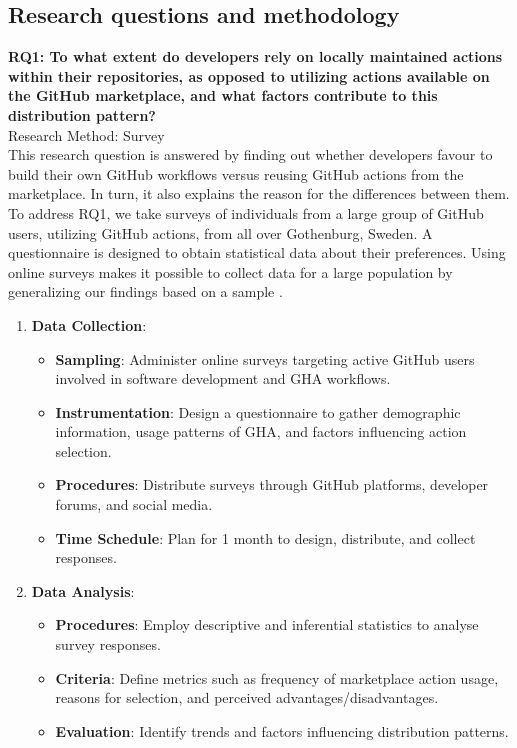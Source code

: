 \documentclass[conference]{IEEEtran}
\begin{document}
\subsection{Research questions and methodology}

\textbf{RQ1: To what extent do developers rely on locally maintained actions within their repositories, as opposed to utilizing actions available on the GitHub marketplace, and what factors contribute to this distribution pattern?}\\

Research Method: Survey\\
	
This research question is answered by finding out whether developers favour to build their own GitHub workflows versus reusing GitHub actions from the marketplace. In turn, it also explains the reason for the differences between them.\\

To address RQ1, we take surveys of individuals from a large group of GitHub users, utilizing GitHub actions, from all over Gothenburg, Sweden. A questionnaire is designed to obtain statistical data about their preferences. Using online surveys makes it possible to collect data for a large population by generalizing our findings based on a sample \cite{linaker2013guidelines}.\\

\begin{enumerate}
    \item \textbf{Data Collection}:\\
    \begin{itemize}
        \item \textbf{Sampling}: Administer online surveys targeting active GitHub users involved in software development and GHA workflows.
        \item \textbf{Instrumentation}: Design a questionnaire to gather demographic information, usage patterns of GHA, and factors influencing action selection.
        \item \textbf{Procedures}: Distribute surveys through GitHub platforms, developer forums, and social media.
        \item \textbf{Time Schedule}: Plan for 1 month to design, distribute, and collect responses.\\
    \end{itemize}
    
    \item \textbf{Data Analysis}:\\
    \begin{itemize}
        \item \textbf{Procedures}: Employ descriptive and inferential statistics to analyse survey responses.
        \item \textbf{Criteria}: Define metrics such as frequency of marketplace action usage, reasons for selection, and perceived advantages/disadvantages.
        \item \textbf{Evaluation}: Identify trends and factors influencing distribution patterns.\\
    \end{itemize}
\end{enumerate}
\end{document}
